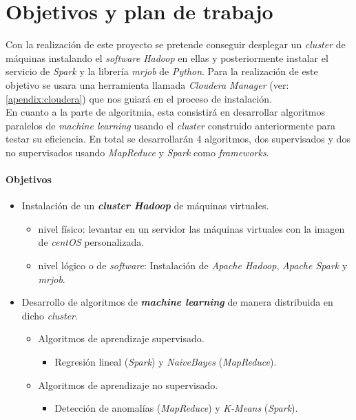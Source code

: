 
\chapter*{Objetivos y plan de trabajo}\label{objetivos_plan_trabajo}
Con la realización de este proyecto se pretende conseguir desplegar un \textit{cluster} de máquinas instalando el
\textit{software Hadoop} en ellas y posteriormente instalar el servicio de \textit{Spark} y la librería \textit{mrjob}
de \textit{Python}. Para la realización de este objetivo se usara una herramienta llamada \textit{Cloudera Manager} 
(ver: \autoref{apendix:cloudera}) que nos guiará en el proceso de instalación. \\
En cuanto a la parte de algoritmia, esta consistirá en desarrollar algoritmos paralelos de \textit{machine learning} 
usando el \textit{cluster} construido anteriormente para testar su eficiencia. En total se desarrollarán 4 algoritmos,
dos supervisados y dos no supervisados usando \textit{MapReduce} y \textit{Spark} como \textit{frameworks}.
\newline

\subsubsection*{Objetivos}
\begin{itemize}
  \item Instalación de un \textbf{\textit{cluster Hadoop}} de máquinas virtuales.
  \begin{itemize}
    \item nivel físico: levantar en un servidor las máquinas virtuales con la imagen de \textit{centOS} personalizada.
    \item nivel lógico o de \textit{software}: Instalación de \textit{Apache Hadoop}, \textit{Apache Spark} 
          y \textit{mrjob}.
  \end{itemize}
  \item Desarrollo de algoritmos de \textbf{\textit{machine learning}} de manera distribuida en dicho \textit{cluster}.
  \begin{itemize}
    \item Algoritmos de aprendizaje supervisado.
    \begin{itemize}
      \item Regresión lineal (\textit{Spark}) y \textit{NaiveBayes} (\textit{MapReduce}).
    \end{itemize}
    \item Algoritmos de aprendizaje no supervisado.
    \begin{itemize}
      \item Detección de anomalías (\textit{MapReduce}) y \textit{K-Means} (\textit{Spark}).
    \end{itemize}
  \end{itemize}
\end{itemize}

